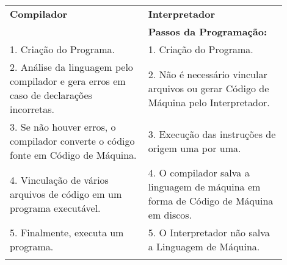 \documentclass[12pt,a4paper]{abntex2}
\begin{document}
\begin{tabular}{|p{0.45\linewidth}|p{0.45\linewidth}|}
\hline
\textbf{Compilador} & \textbf{Interpretador} \\
\hdashline

\begin{comment}
\textbf{Passos da Programação:} & \textbf{Passos da Programação:} \\
\hline
1. Criação do Programa. & 1. Criação do Programa. \\
\hline
2. Análise da linguagem pelo compilador e gera erros em caso de declarações incorretas.
    & 2. Não é necessário vincular arquivos ou gerar Código de Máquina pelo Interpretador. \\
\hline
3. Se não houver erros, o compilador converte o código fonte em Código de Máquina.
    & 3. Execução das instruções de origem uma por uma. \\
\hline
4. Vinculação de vários arquivos de código em um programa executável.
& 4. O compilador salva a linguagem de máquina em forma de Código de Máquina em discos. \\
\hline
5. Finalmente, executa um programa. & 5. O Interpretador não salva a Linguagem de Máquina. \\
\hline
\end{comment}


\end{tabular}
\end{document}
